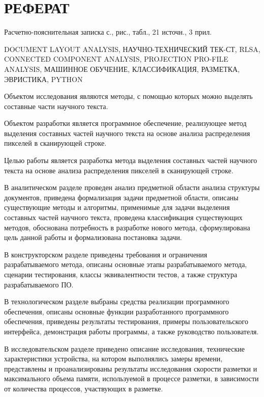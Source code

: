 \section*{РЕФЕРАТ}

Расчетно-пояснительная записка \pageref{LastPage} с.,  рис.,  табл., 21 источн., 3 прил.

DOCUMENT LAYOUT ANALYSIS,
НАУЧНО-ТЕХНИЧЕСКИЙ ТЕК-СТ,
RLSA,
CONNECTED COMPONENT ANALYSIS,
PROJECTION PRO-FILE ANALYSIS,
МАШИННОЕ ОБУЧЕНИЕ,
КЛАССИФИКАЦИЯ,
РАЗМЕТКА,
ЭВРИСТИКА,
PYTHON

Объектом исследования являются методы, с помощью которых можно выделять составные части научного текста.

Объектом разработки является программное обеспечение, реализующее метод выделения составных частей научного текста на основе анализа распределения пикселей в сканирующей строке.

Целью работы является разработка метода выделения составных частей научного текста на основе анализа распределения пикселей в сканирующей строке.

В аналитическом разделе проведен анализ предметной области анализа структуры документов, приведена формализация задачи предметной области, описаны существующие методы и алгоритмы, применимые для задачи выделения составных частей научного текста, проведена классификация существующих методов, обоснована потребность в разработке нового метода, сформулирована цель данной работы и формализована постановка задачи.

В конструкторском разделе приведены требования и ограничения разрабатываемого метода, описаны основные этапы разрабатываемого метода, сценарии тестирования, классы эквивалентности тестов, а также структура разрабатываемого ПО.

В технологическом разделе выбраны средства реализации программного обеспечения, описаны основные функции разработанного программного обеспечения, приведены результаты тестирования, примеры пользовательского интерфейса, демонстрация работы программы, а также руководство пользователя.

В исследовательском разделе приведено описание исследования, технические характеристики устройства, на котором выполнялись замеры времени, представлены и проанализированы результаты исследования скорости разметки и максимального объема памяти, используемой в процессе разметки, в зависимости от количества процессов, участвующих в разметке.

